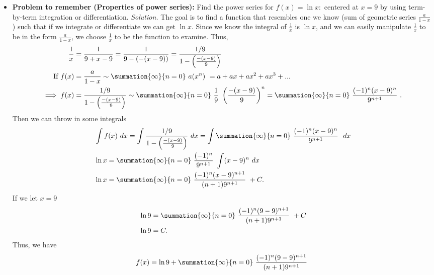 \documentclass{report}
\begin{document}
\begin{itemize}
\begin{remark}
                \end{remark}
            \item \textbf{Problem to remember (Properties of power series):} Find the power series for $f(x) = \ln{x}:$ centered at $x=9$ by using term-by-term integration or differentiation.
                \smallbreak \noindent
                \textit{Solution.} The goal is to find a function that resembles one we know (sum of geometric series $\frac{a}{1-x}$) such that if we integrate or differentiate we can get $\ln{x}$. Since we know the integral of $\frac{1}{x}$ is $\ln{x}$, and we can easily manipulate $\frac{1}{x}$ to be in the form $\frac{a}{1-x}$, we choose $\frac{1}{x} $ to be the function to examine. Thus, 
                \begin{align*}
                    \frac{1}{x} &= \frac{1}{9+x-9} = \frac{1}{9-(-(x-9))} = \frac{1/9}{1-\left(\frac{-(x-9)}{9}\right)} \\
                    \text{If } f(x) &= \frac{a}{1-x} \sim \summation{\infty}{n=0}\ a(x^{n})\ = a + ax + ax^{2} + ax^{3} + ... \\
                    \implies f(x) &= \frac{1/9}{1-\left(\frac{-(x-9)}{9}\right)} \sim \summation{\infty}{n=0}\ \frac{1}{9}\ \left(\frac{-(x-9)}{9}\right)^{n} = \summation{\infty}{n=0}\ \frac{(-1)^{n}(x-9)^{n}}{9^{n+1}}\ 
                .\end{align*}
                Then we can throw in some integrals
                \begin{align*}
                    &\int f(x)\ dx = \int \frac{1/9}{1-\left(\frac{-(x-9)}{9}\right)}\ dx = \int \summation{\infty}{n=0}\ \frac{(-1)^{n}(x-9)^{n}}{9^{n+1}}\ \ dx \\
                    &\ln{x} = \summation{\infty}{n=0}\ \frac{(-1)^{n}}{9^{n+1}}\  \int (x-9)^{n}\ dx \\
                    &\ln{x}  =  \summation{\infty}{n=0}\ \frac{(-1)^{n}(x-9)^{n+1}}{(n+1)9^{n+1}}\ + C 
                .\end{align*}
                If we let $x=9$
                \begin{align*}
                    &\ln{9}  =  \summation{\infty}{n=0}\ \frac{(-1)^{n}(9-9)^{n+1}}{(n+1)9^{n+1}}\ + C  \\
                    &\ln{9} = C
                .\end{align*}
                Thus, we have
                \begin{align*}
                    f(x) = \ln{9} + \summation{\infty}{n=0}\ \frac{(-1)^{n}(9-9)^{n+1}}{(n+1)9^{n+1}}\  \\

\end{align*}
\end{itemize}
\end{document}
